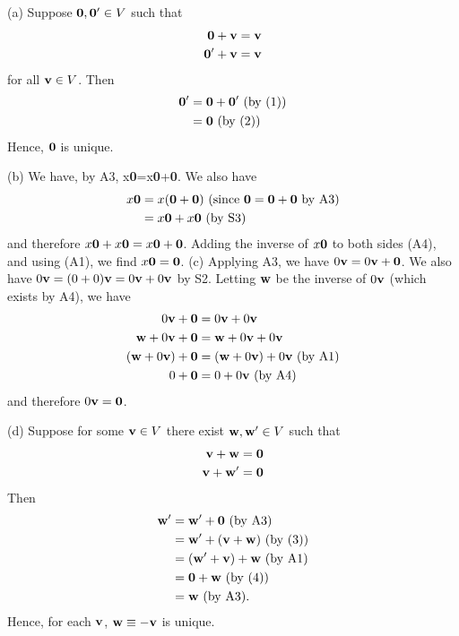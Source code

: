 \documentclass[12pt,letterpaper,reqno]{article}
\numberwithin{equation}{section}
\begin{document}
\begin{pf}
(a) Suppose ${\bf 0},{\bf 0'} \in V$ such that 
\begin{align}
	{\bf 0}+{\bf v} &={\bf v} \\
	{\bf 0'}+{\bf v} &={\bf v}
\end{align}
for all ${\bf v} \in V$. Then 
\begin{align*}
	{\bf 0'}&={\bf 0}+{\bf 0'} \text{ (by (1))} \\
	&={\bf 0} \text{ (by (2))} \\
\end{align*}
Hence, ${\bf 0}$ is unique. 

(b) We have, by A3, x{\bf 0}=x{\bf 0}+{\bf 0}. We also have
\begin{align*}
	x{\bf 0}&=x({\bf 0}+{\bf 0}) \text{ (since ${\bf 0}={\bf 0}+{\bf 0}$ by A3)} \\
	&=x{\bf 0}+x{\bf 0} \text{ (by S3)}
\end{align*} and therefore $x{\bf 0}+x{\bf 0}=x{\bf 0}+{\bf 0}$. Adding the inverse of $x{\bf 0}$ to both sides (A4), and using (A1), we find $x{\bf 0}={\bf 0}$.	
(c) Applying A3, we have $0{\bf v}=0{\bf v}+{\bf 0}$. We also have
$0{\bf v} =(0+0){\bf v}=0{\bf v} + 0{\bf v}$ by S2. Letting ${\bf w}$ be the inverse of $0{\bf v}$ (which exists by A4), we have
\begin{align*}
	0{\bf v}+{\bf 0}&=0{\bf v}+0{\bf v} \\
	{\bf w}+0{\bf v}+{\bf 0}&={\bf w}+0{\bf v}+0{\bf v} \\
	({\bf w}+0{\bf v})+{\bf 0}&=({\bf w}+0{\bf v})+0{\bf v} \text{ (by A1)}\\
	0+{\bf 0}&=0+0{\bf v} \text{ (by A4)}
\end{align*} and therefore $0{\bf v}={\bf 0}$. 

(d) Suppose for some ${\bf v} \in V$ there exist ${\bf w},{\bf w'} \in V$ such that
\begin{align}
	{\bf v}+{\bf w} &={\bf 0} \\
	{\bf v}+{\bf w'} &={\bf 0}
\end{align} Then
\begin{align*}
	{\bf w'}&={\bf w'}+{\bf 0} \text{ (by A3)}\\
	&={\bf w'}+({\bf v}+{\bf w}) \text{ (by (3))} \\
	&=({\bf w'}+{\bf v})+{\bf w} \text{ (by A1)} \\
	&={\bf 0}+{\bf w} \text{ (by (4))} \\
	&={\bf w} \text{ (by A3).}
\end{align*} Hence, for each ${\bf v}$, ${\bf w}\equiv -{\bf v}$ is unique.


\end{pf}
\end{document}
